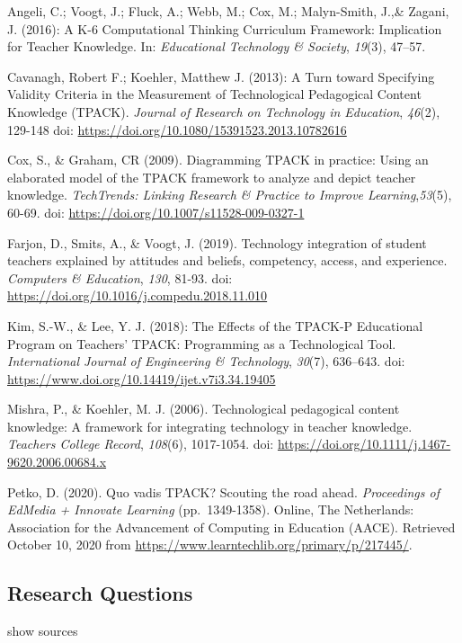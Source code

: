 \documentclass[
]{article}
\begin{document}
Angeli, C.; Voogt, J.; Fluck, A.; Webb, M.; Cox, M.; Malyn-Smith, J.,\&
Zagani, J. (2016): A K-6 Computational Thinking Curriculum Framework:
Implication for Teacher Knowledge. In: \emph{Educational Technology \&
Society}, \emph{19}(3), 47--57.

Cavanagh, Robert F.; Koehler, Matthew J. (2013): A Turn toward
Specifying Validity Criteria in the Measurement of Technological
Pedagogical Content Knowledge (TPACK). \emph{Journal of Research on
Technology in Education}, \emph{46}(2), 129-148 doi:
\url{https://doi.org/10.1080/15391523.2013.10782616}

Cox, S., \& Graham, CR (2009). Diagramming TPACK in practice: Using an
elaborated model of the TPACK framework to analyze and depict teacher
knowledge. \emph{TechTrends: Linking Research \& Practice to Improve
Learning},\emph{53}(5), 60-69. doi:
\url{https://doi.org/10.1007/s11528-009-0327-1}

Farjon, D., Smits, A., \& Voogt, J. (2019). Technology integration of
student teachers explained by attitudes and beliefs, competency, access,
and experience. \emph{Computers \& Education}, \emph{130}, 81-93. doi:
\url{https://doi.org/10.1016/j.compedu.2018.11.010}

Kim, S.-W., \& Lee, Y. J. (2018): The Effects of the TPACK-P Educational
Program on Teachers' TPACK: Programming as a Technological Tool.
\emph{International Journal of Engineering \& Technology}, \emph{30}(7),
636--643. doi: \url{https://www.doi.org/10.14419/ijet.v7i3.34.19405}

Mishra, P., \& Koehler, M. J. (2006). Technological pedagogical content
knowledge: A framework for integrating technology in teacher knowledge.
\emph{Teachers College Record}, \emph{108}(6), 1017-1054. doi:
\url{https://doi.org/10.1111/j.1467-9620.2006.00684.x}

Petko, D. (2020). Quo vadis TPACK? Scouting the road ahead.
\emph{Proceedings of EdMedia + Innovate Learning} (pp.~1349-1358).
Online, The Netherlands: Association for the Advancement of Computing in
Education (AACE). Retrieved October 10, 2020 from
\url{https://www.learntechlib.org/primary/p/217445/}.

\hypertarget{research-questions}{%
\subsection{Research Questions}\label{research-questions}}

show sources
\end{document}
